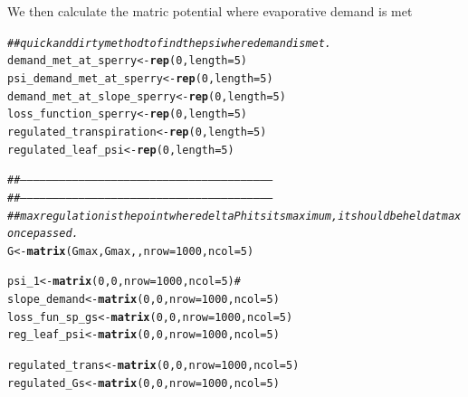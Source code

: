 \documentclass[a4paper]{article}\usepackage[]{graphicx}\usepackage[]{color}
\makeatletter
\newcommand{\hlnum}[1]{\textcolor[rgb]{0.686,0.059,0.569}{#1}}%
\newcommand{\hlcom}[1]{\textcolor[rgb]{0.678,0.584,0.686}{\textit{#1}}}%
\newcommand{\hlstd}[1]{\textcolor[rgb]{0.345,0.345,0.345}{#1}}%
\newcommand{\hlkwb}[1]{\textcolor[rgb]{0.69,0.353,0.396}{#1}}%
\newcommand{\hlkwc}[1]{\textcolor[rgb]{0.333,0.667,0.333}{#1}}%
\newcommand{\hlkwd}[1]{\textcolor[rgb]{0.737,0.353,0.396}{\textbf{#1}}}%
\newenvironment{kframe}{%
 \def\at@end@of@kframe{}%
 \ifinner\ifhmode%
  \def\at@end@of@kframe{\end{minipage}}%
  \begin{minipage}{\columnwidth}%
 \fi\fi%
 \def\FrameCommand##1{\hskip\@totalleftmargin \hskip-\fboxsep
 \colorbox{shadecolor}{##1}\hskip-\fboxsep
     \hskip-\linewidth \hskip-\@totalleftmargin \hskip\columnwidth}%
 \MakeFramed {\advance\hsize-\width
   \@totalleftmargin\z@ \linewidth\hsize
   \@setminipage}}%
 {\par\unskip\endMakeFramed%
 \at@end@of@kframe}
\newenvironment{knitrout}{}{} %
\makeatother
\begin{document}
We then calculate the matric potential where evaporative demand is met
\begin{knitrout}
\color{fgcolor}\begin{kframe}
\begin{alltt}
\hlcom{## quick and dirty method to find the psi where demand is met. }
\hlstd{demand_met_at_sperry} \hlkwb{<-} \hlkwd{rep}\hlstd{(}\hlnum{0}\hlstd{,} \hlkwc{length}\hlstd{=}\hlnum{5}\hlstd{)}
\hlstd{psi_demand_met_at_sperry} \hlkwb{<-} \hlkwd{rep}\hlstd{(}\hlnum{0}\hlstd{,} \hlkwc{length}\hlstd{=}\hlnum{5}\hlstd{)}
\hlstd{demand_met_at_slope_sperry} \hlkwb{<-} \hlkwd{rep}\hlstd{(}\hlnum{0}\hlstd{,} \hlkwc{length}\hlstd{=}\hlnum{5}\hlstd{)}
\hlstd{loss_function_sperry} \hlkwb{<-} \hlkwd{rep}\hlstd{(}\hlnum{0}\hlstd{,} \hlkwc{length}\hlstd{=}\hlnum{5}\hlstd{)}
\hlstd{regulated_transpiration} \hlkwb{<-} \hlkwd{rep}\hlstd{(}\hlnum{0}\hlstd{,} \hlkwc{length}\hlstd{=}\hlnum{5}\hlstd{)}
\hlstd{regulated_leaf_psi} \hlkwb{<-} \hlkwd{rep}\hlstd{(}\hlnum{0}\hlstd{,} \hlkwc{length}\hlstd{=}\hlnum{5}\hlstd{)}

\hlcom{##---------------------------------------------------------------------------------------------------------------------}
\hlcom{##---------------------------------------------------------------------------------------------------------------------}
\hlcom{## max regulation is the point where delta P hits its maximum, it should be held at max once passed.}
\hlstd{G} \hlkwb{<-} \hlkwd{matrix}\hlstd{(Gmax, Gmax, ,}\hlkwc{nrow}\hlstd{=}\hlnum{1000}\hlstd{,} \hlkwc{ncol}\hlstd{=}\hlnum{5}\hlstd{)}

\hlstd{psi_1} \hlkwb{<-} \hlkwd{matrix}\hlstd{(}\hlnum{0}\hlstd{,}\hlnum{0}\hlstd{,}\hlkwc{nrow}\hlstd{=}\hlnum{1000}\hlstd{,} \hlkwc{ncol}\hlstd{=}\hlnum{5}\hlstd{)}\hlcom{#}
\hlstd{slope_demand} \hlkwb{<-} \hlkwd{matrix}\hlstd{(}\hlnum{0}\hlstd{,}\hlnum{0}\hlstd{,}\hlkwc{nrow}\hlstd{=}\hlnum{1000}\hlstd{,} \hlkwc{ncol}\hlstd{=}\hlnum{5}\hlstd{)}
\hlstd{loss_fun_sp_gs} \hlkwb{<-} \hlkwd{matrix}\hlstd{(}\hlnum{0}\hlstd{,}\hlnum{0}\hlstd{,}\hlkwc{nrow}\hlstd{=}\hlnum{1000}\hlstd{,} \hlkwc{ncol}\hlstd{=}\hlnum{5}\hlstd{)}
\hlstd{reg_leaf_psi} \hlkwb{<-} \hlkwd{matrix}\hlstd{(}\hlnum{0}\hlstd{,}\hlnum{0}\hlstd{,}\hlkwc{nrow}\hlstd{=}\hlnum{1000}\hlstd{,} \hlkwc{ncol}\hlstd{=}\hlnum{5}\hlstd{)}

\hlstd{regulated_trans} \hlkwb{<-} \hlkwd{matrix}\hlstd{(}\hlnum{0}\hlstd{,}\hlnum{0}\hlstd{,}\hlkwc{nrow}\hlstd{=}\hlnum{1000}\hlstd{,} \hlkwc{ncol}\hlstd{=}\hlnum{5}\hlstd{)}
\hlstd{regulated_Gs} \hlkwb{<-} \hlkwd{matrix}\hlstd{(}\hlnum{0}\hlstd{,}\hlnum{0}\hlstd{,}\hlkwc{nrow}\hlstd{=}\hlnum{1000}\hlstd{,} \hlkwc{ncol}\hlstd{=}\hlnum{5}\hlstd{)}


\end{alltt}
\end{kframe}
\end{knitrout}
\end{document}
